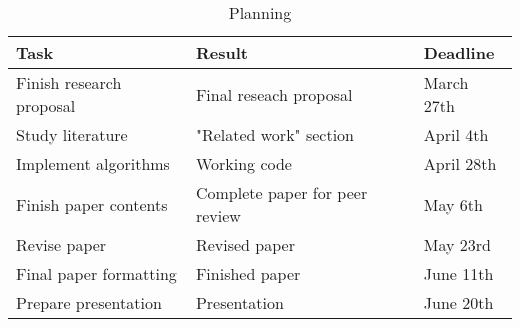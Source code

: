 \documentclass{acm_proc_article-sp}
\begin{document}
\begin{table*}
\begin{center}
\begin{tabular}{ | l | l | l | }
\hline
\textbf{Task} & \textbf{Result} & \textbf{Deadline} \\
\hline
Finish research proposal
    & Final reseach proposal
    & March 27th \\
Study literature
    & "Related work" section
    & April 4th \\
Implement algorithms
    & Working code
    & April 28th \\
Finish paper contents
    & Complete paper for peer review
    & May 6th \\
Revise paper
    & Revised paper
    & May 23rd \\
Final paper formatting
    & Finished paper
    & June 11th \\
Prepare presentation
    & Presentation
    & June 20th \\
\hline
\end{tabular}
\caption{Planning}
\label{tab-planning}
\end{center}
\end{table*}



\end{document}
